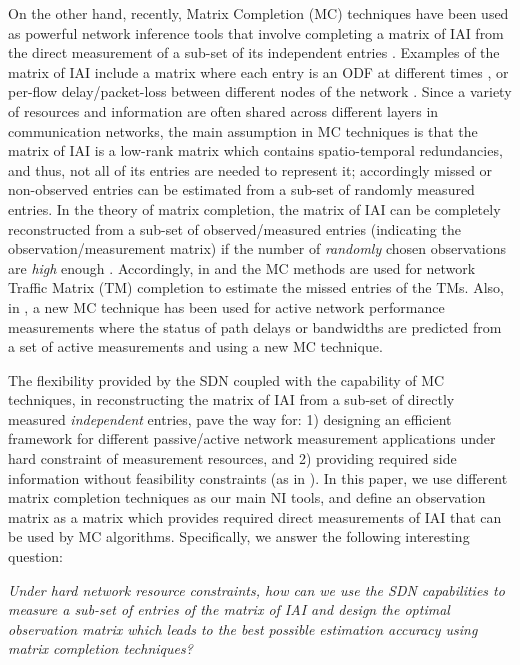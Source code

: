 On the other hand, recently, Matrix Completion (MC) techniques have been used as powerful network inference tools that involve completing a matrix of IAI from the direct measurement of a sub-set of its independent entries \cite{Roughan:2012}\cite{Gursun:2011}\cite{YLiao:2011}. Examples of the matrix of IAI include a matrix where each entry is an ODF at different times \cite{Roughan:2012}, or per-flow delay/packet-loss between different nodes of the network \cite{YLiao:2011}. Since a variety of resources and information are often shared across different layers in communication networks, the main assumption in MC techniques is that the matrix of IAI is a low-rank matrix which contains spatio-temporal redundancies, and thus, not all of its entries are needed to represent it; accordingly missed or non-observed entries can be estimated from a sub-set of randomly measured entries. In the theory of matrix completion, the matrix of IAI can be completely reconstructed from a sub-set of observed/measured entries (indicating the observation/measurement matrix) if the number of \emph{randomly} chosen observations are \emph{high} enough \cite{Candes:2009}\cite{Candes:2010}. Accordingly, in \cite{Roughan:2012} and \cite{Gursun:2011} the MC methods are used for network Traffic Matrix (TM) completion to estimate the missed entries of the TMs. Also, in \cite{YLiao:2011}, a new MC technique has been used for active network performance measurements where the status of path delays or bandwidths are predicted from a set of active measurements and using a new MC technique.

The flexibility provided by the SDN coupled with the capability of MC techniques, in reconstructing the matrix of IAI from a sub-set of directly measured \emph{independent} entries, pave the way for: 1) designing an efficient framework for different passive/active network measurement applications under hard constraint of measurement resources, and 2) providing required side information without feasibility constraints (as in \cite{IF14iSTAMP:2014}). In this paper, we use different matrix completion techniques as our main NI tools, and define an observation matrix as a matrix which provides required direct measurements of IAI that can be used by MC algorithms. Specifically, we answer the following interesting question:

\emph{Under hard network resource constraints, how can we use the SDN capabilities to measure a sub-set of entries of the matrix of IAI and design the optimal observation matrix which leads to the best possible estimation accuracy using matrix completion techniques?}

